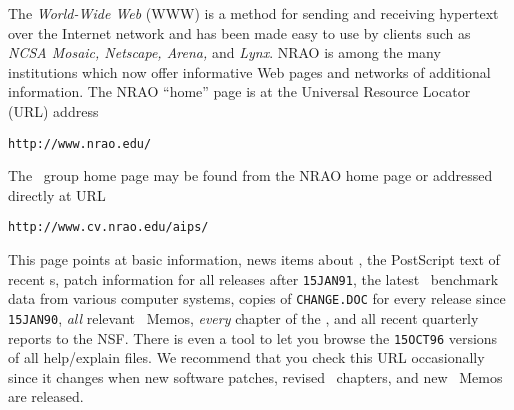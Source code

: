      The {\it World-Wide Web\/} (WWW) is a method for sending and
receiving hypertext over the Internet network and has been made easy
to use by clients such as {\it NCSA Mosaic, Netscape, Arena,\/} and
{\it Lynx\/}.  NRAO is among the many institutions which now offer
informative Web pages and networks of additional information.  The
NRAO ``home'' page is at the Universal Resource Locator (URL) address
\begin{center}
\vskip -10pt
{\tt http://www.nrao.edu/}
\vskip -10pt
\end{center}
The \AIPS\ group home page may be found from the NRAO home page or
addressed directly at URL
\begin{center}
\vskip -10pt
{\tt http://www.cv.nrao.edu/aips/}
\vskip -10pt
\end{center}
This page points at basic information, news items about \AIPS, the
PostScript text of recent \AIPSLETTER s, patch information for all
releases after {\tt 15JAN91}, the latest \AIPS\ benchmark data from
various computer systems, copies of {\tt CHANGE.DOC} for every release
since {\tt 15JAN90}, {\it all} relevant \AIPS\ Memos, {\it every}
chapter of the \Cookbook, and all recent quarterly reports to the
\hbox{NSF}.  There is even a tool to let you browse the {\tt 15OCT96}
versions of all help/explain files.  We recommend that you check this
URL occasionally since it changes when new software patches, revised
\Cookbook\ chapters, and new \AIPS\ Memos are released.

